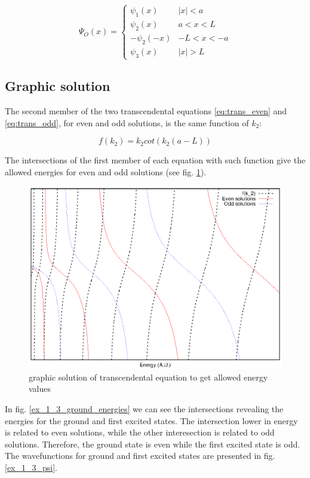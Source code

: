 \documentclass{article}
\begin{document}
\begin{equation}
\Psi_{O}(x) = 
  \begin{cases} 
      \psi_{1}(x) & \left|x\right| < a \\
      \psi_{2}(x) & a < x < L \\
      -\psi_{2}(-x) & -L < x < -a \\
      \psi_{3}(x) & \left|x\right| > L
   \end{cases}
\end{equation}

\subsection{Graphic solution}
The second member of the two transcendental equations \eqref{eq:trans_even} and \eqref{eq:trans_odd}, for even and odd solutions, is the same function of \(k_{2}\):

\begin{equation}
f(k_{2}) = k_{2} cot(k_{2}(a-L))
\end{equation}

The intersections of the first member of each equation with such function give the allowed energies for even and odd solutions (see fig. \ref{graph_sol_ex_1_3}).

\begin{figure}
\centering
\includegraphics{graph_sol_ex_1_3.eps}
\caption{graphic solution of transcendental equation to get allowed energy values}
\label{graph_sol_ex_1_3}
\end{figure}

In fig. \ref{ex_1_3_ground_energies} we can see the intersections revealing the energies for the ground and first excited states. The intersection lower in energy is related to even solutions, while the other interesection is related to odd solutions. Therefore, the ground state is even while the first excited state is odd. The wavefunctions for ground and first excited states are presented in fig. \ref{ex_1_3_psi}.
\end{document}
